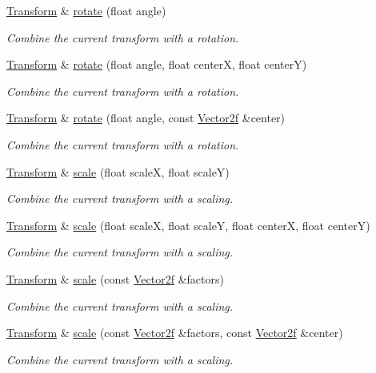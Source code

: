 \begin{DoxyCompactItemize}
\mbox{\hyperlink{classsf_1_1_transform}{Transform}} \& \mbox{\hyperlink{classsf_1_1_transform_a3e548c3c9e3fb9d4bd43cf852669e555}{rotate}} (float angle)
\begin{DoxyCompactList}\small\item\em Combine the current transform with a rotation. \end{DoxyCompactList}\item 
\mbox{\hyperlink{classsf_1_1_transform}{Transform}} \& \mbox{\hyperlink{classsf_1_1_transform_af0b7cc3fed36d0fa22d5d331a779eee2}{rotate}} (float angle, float centerX, float centerY)
\begin{DoxyCompactList}\small\item\em Combine the current transform with a rotation. \end{DoxyCompactList}\item 
\mbox{\hyperlink{classsf_1_1_transform}{Transform}} \& \mbox{\hyperlink{classsf_1_1_transform_ad2a2520ad81724079d109d4a986f9902}{rotate}} (float angle, const \mbox{\hyperlink{classsf_1_1_vector2}{Vector2f}} \&center)
\begin{DoxyCompactList}\small\item\em Combine the current transform with a rotation. \end{DoxyCompactList}\item 
\mbox{\hyperlink{classsf_1_1_transform}{Transform}} \& \mbox{\hyperlink{classsf_1_1_transform_a3f46af807f69d74120fb836334268671}{scale}} (float scaleX, float scaleY)
\begin{DoxyCompactList}\small\item\em Combine the current transform with a scaling. \end{DoxyCompactList}\item 
\mbox{\hyperlink{classsf_1_1_transform}{Transform}} \& \mbox{\hyperlink{classsf_1_1_transform_a6eaeedd35e289cb17f9bf7f24dc28daa}{scale}} (float scaleX, float scaleY, float centerX, float centerY)
\begin{DoxyCompactList}\small\item\em Combine the current transform with a scaling. \end{DoxyCompactList}\item 
\mbox{\hyperlink{classsf_1_1_transform}{Transform}} \& \mbox{\hyperlink{classsf_1_1_transform_a3d57622a7ab309925c9d9887c99cc720}{scale}} (const \mbox{\hyperlink{classsf_1_1_vector2}{Vector2f}} \&factors)
\begin{DoxyCompactList}\small\item\em Combine the current transform with a scaling. \end{DoxyCompactList}\item 
\mbox{\hyperlink{classsf_1_1_transform}{Transform}} \& \mbox{\hyperlink{classsf_1_1_transform_a9198da375173127901f3095e0165ee1b}{scale}} (const \mbox{\hyperlink{classsf_1_1_vector2}{Vector2f}} \&factors, const \mbox{\hyperlink{classsf_1_1_vector2}{Vector2f}} \&center)
\begin{DoxyCompactList}\small\item\em Combine the current transform with a scaling. \end{DoxyCompactList}\end{DoxyCompactItemize}
